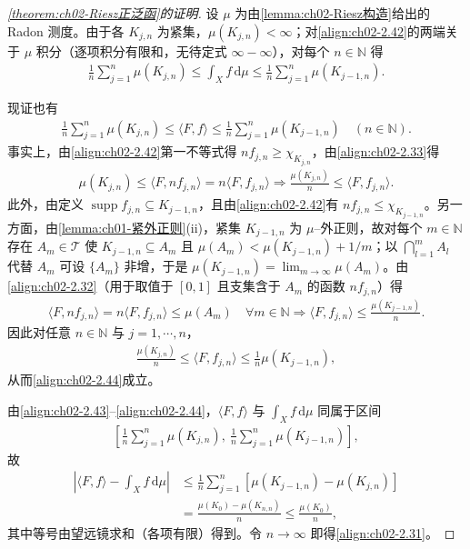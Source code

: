 \documentclass[../../main.tex]{subfiles}%
\begin{document}
\begin{proof}[\cref{theorem:ch02-Riesz正泛函}的证明]
设 $\mu$ 为由\cref{lemma:ch02-Riesz构造}给出的 Radon 测度。由于各 $K_{j,n}$ 为紧集，$\mu(K_{j,n})<\infty$；对\eqref{align:ch02-2.42}的两端关于 $\mu$ 积分（逐项积分有限和，无待定式 $\infty-\infty$），对每个 $n\in\mathbb N$ 得
\begin{align}
\frac1n\sum_{j=1}^n\mu(K_{j,n})\leqslant\int_Xf\,\mathrm{d}\mu
\leqslant\frac1n\sum_{j=1}^n\mu(K_{j-1,n}). \label{align:ch02-2.43}
\end{align}

现证也有
\begin{align}
\frac1n\sum_{j=1}^n\mu(K_{j,n})\leqslant\langle F,f\rangle
\leqslant\frac1n\sum_{j=1}^n\mu(K_{j-1,n})\quad(n\in\mathbb N). \label{align:ch02-2.44}
\end{align}
事实上，由\eqref{align:ch02-2.42}第一不等式得 $nf_{j,n}\geqslant\chi_{K_{j,n}}$，由\eqref{align:ch02-2.33}得
\begin{align*}
\mu(K_{j,n})\leqslant\langle F,nf_{j,n}\rangle=n\langle F,f_{j,n}\rangle
\Rightarrow\frac{\mu(K_{j,n})}n\leqslant\langle F,f_{j,n}\rangle.
\end{align*}
此外，由定义 $\operatorname{supp}f_{j,n}\subseteq K_{j-1,n}$，且由\eqref{align:ch02-2.42}有 $nf_{j,n}\leqslant\chi_{K_{j-1,n}}$。另一方面，由\cref{lemma:ch01-紧外正则}(ii)，紧集 $K_{j-1,n}$ 为 $\mu$--外正则，故对每个 $m\in\mathbb N$ 存在 $A_m\in\mathscr T$ 使 $K_{j-1,n}\subseteq A_m$ 且 $\mu(A_m)<\mu(K_{j-1,n})+1/m$；以 $\bigcap_{l=1}^mA_l$ 代替 $A_m$ 可设 $\{A_m\}$ 非增，于是 $\mu(K_{j-1,n})=\lim_{m\to\infty}\mu(A_m)$。由\eqref{align:ch02-2.32}（用于取值于 $[0,1]$ 且支集含于 $A_m$ 的函数 $nf_{j,n}$）得
\begin{align*}
\langle F,nf_{j,n}\rangle=n\langle F,f_{j,n}\rangle\leqslant\mu(A_m)\quad\forall m\in\mathbb N
\Rightarrow\langle F,f_{j,n}\rangle\leqslant\frac{\mu(K_{j-1,n})}n.
\end{align*}
因此对任意 $n\in\mathbb N$ 与 $j=1,\cdots,n$，
\begin{align*}
\frac{\mu(K_{j,n})}n\leqslant\langle F,f_{j,n}\rangle\leqslant\frac1n\mu(K_{j-1,n}),
\end{align*}
从而\eqref{align:ch02-2.44}成立。

由\eqref{align:ch02-2.43}--\eqref{align:ch02-2.44}，$\langle F,f\rangle$ 与 $\int_Xf\,\mathrm{d}\mu$ 同属于区间
\begin{align*}
\left[\frac1n\sum_{j=1}^n\mu(K_{j,n}),\ \frac1n\sum_{j=1}^n\mu(K_{j-1,n})\right],
\end{align*}
故
\begin{align*}
\left|\langle F,f\rangle-\int_Xf\,\mathrm{d}\mu\right|
&\leqslant\frac1n\sum_{j=1}^n[\mu(K_{j-1,n})-\mu(K_{j,n})]\\
&=\frac{\mu(K_0)-\mu(K_{n,n})}n\leqslant\frac{\mu(K_0)}n,
\end{align*}
其中等号由望远镜求和（各项有限）得到。令 $n\to\infty$ 即得\eqref{align:ch02-2.31}。


\end{proof}
\end{document}
